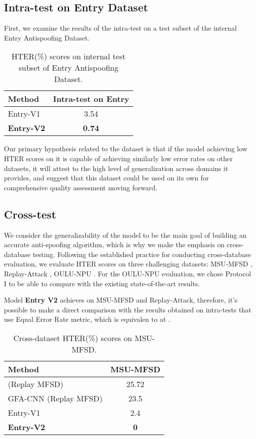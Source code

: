 \documentclass[10pt,twocolumn,letterpaper]{article}
\begin{document}
\subsection{Intra-test on Entry Dataset}

First, we examine the results of the intra-test on a test subset of the internal Entry Antispoofing Dataset.

\begin{table}[h]
  \centering
  \begin{tabular}{@{}lc@{}}
    \toprule
    \textbf{Method} & \textbf{Intra-test on Entry} \\
    \midrule
    \midrule
    Entry-V1 & 3.54 \\
    \textbf{Entry-V2} & \textbf{0.74} \\
    \bottomrule
  \end{tabular}
  \caption{HTER(\%) scores on internal test subset of Entry Antispoofing Dataset. }
  \label{tab:intra-test}
\end{table}

Our primary hypothesis related to the dataset is that if the model achieving low HTER scores on it is capable of achieving similarly low error rates on other datasets, it will attest to the high level of generalization across domains it provides, and suggest that this dataset could be used on its own for comprehensive quality assessment moving forward.

\subsection{Cross-test}

We consider the generalizability of the model to be the main goal of building an accurate anti-spoofing algorithm, which is why we make the emphasis on cross-database testing. Following the established practice for conducting cross-database evaluation, we evaluate HTER scores on three challenging datasets: MSU-MFSD \cite{MFSD}, Replay-Attack \cite{mci/Chingovska2012}, OULU-NPU \cite{OULU_NPU_2017}. For the OULU-NPU evaluation, we chose Protocol I to be able to compare with the existing state-of-the-art results.

Model \textbf{Entry V2} achieves  on MSU-MFSD and Replay-Attack, therefore, it's possible to make a direct comparison with the results obtained on intra-tests that use Equal Error Rate metric, which is equivalen to  at .

\begin{table}[h]
  \centering
  \begin{tabular}{@{}lc@{}}
    \toprule
    \textbf{Method} & \textbf{MSU-MFSD} \\
    \midrule
    \midrule
     (Replay  MFSD)\cite{CNN-LSTM} & 25.72 \\
    GFA-CNN (Replay  MFSD)\cite{GFA-CNN} & 23.5 \\
    Entry-V1 & 2.4 \\
    \textbf{Entry-V2} & \textbf{0} \\
    \bottomrule
  \end{tabular}
  \caption{Cross-dataset HTER(\%) scores on MSU-MFSD\cite{MFSD}.}
  \label{tab:cross-test}
\end{table}
\end{document}
